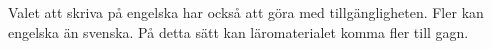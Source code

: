 Valet att skriva på engelska har också att göra med tillgängligheten. Fler kan
engelska än svenska. På detta sätt kan läromaterialet komma fler till gagn.

